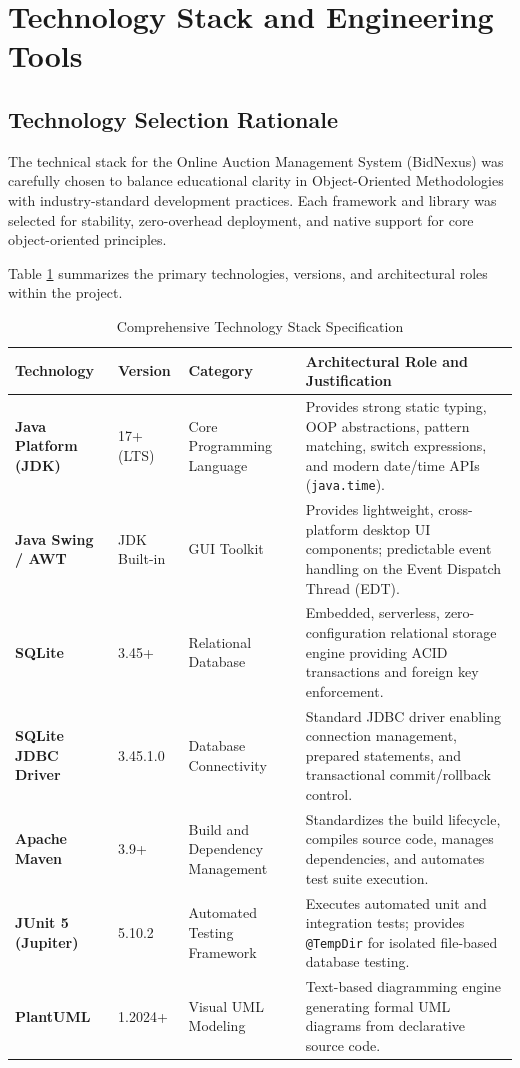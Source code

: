 \section{Technology Stack and Engineering Tools}
\label{sec:technology_stack}

\subsection{Technology Selection Rationale}
The technical stack for the Online Auction Management System (BidNexus) was carefully chosen to balance educational clarity in Object-Oriented Methodologies with industry-standard development practices. Each framework and library was selected for stability, zero-overhead deployment, and native support for core object-oriented principles.

Table \ref{tab:tech_stack} summarizes the primary technologies, versions, and architectural roles within the project.

\begin{table}[H]
\centering
\small
\caption{Comprehensive Technology Stack Specification}
\label{tab:tech_stack}
\begin{tabularx}{\textwidth}{p{3cm}p{2cm}p{3cm}X}
\toprule
\textbf{Technology} & \textbf{Version} & \textbf{Category} & \textbf{Architectural Role and Justification} \\
\midrule
\textbf{Java Platform (JDK)} & 17+ (LTS) & Core Programming Language & Provides strong static typing, OOP abstractions, pattern matching, switch expressions, and modern date/time APIs (\texttt{java.time}). \\
\addlinespace
\textbf{Java Swing / AWT} & JDK Built-in & GUI Toolkit & Provides lightweight, cross-platform desktop UI components; predictable event handling on the Event Dispatch Thread (EDT). \\
\addlinespace
\textbf{SQLite} & 3.45+ & Relational Database & Embedded, serverless, zero-configuration relational storage engine providing ACID transactions and foreign key enforcement. \\
\addlinespace
\textbf{SQLite JDBC Driver} & 3.45.1.0 & Database Connectivity & Standard JDBC driver enabling connection management, prepared statements, and transactional commit/rollback control. \\
\addlinespace
\textbf{Apache Maven} & 3.9+ & Build and Dependency Management & Standardizes the build lifecycle, compiles source code, manages dependencies, and automates test suite execution. \\
\addlinespace
\textbf{JUnit 5 (Jupiter)} & 5.10.2 & Automated Testing Framework & Executes automated unit and integration tests; provides \texttt{@TempDir} for isolated file-based database testing. \\
\addlinespace
\textbf{PlantUML} & 1.2024+ & Visual UML Modeling & Text-based diagramming engine generating formal UML diagrams from declarative source code. \\
\bottomrule
\end{tabularx}
\end{table}

